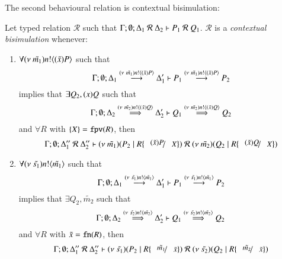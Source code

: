 The second behavioural relation is contextual bisimulation:
%
\begin{definition}\rm
	Let typed relation $\mathcal{R}$ such that $\Gamma; \emptyset; \Delta_1\ \mathcal{R}\ \Delta_2 \proves P_1\ \mathcal{R}\ Q_1$.
	$\mathcal{R}$ is a {\em contextual bisimulation} whenever:
	\begin{enumerate}
		\item	$\forall (\nu\ \tilde{m_1}) n ! \langle (\tilde{x})P \rangle$ such that
			\[
				\Gamma; \emptyset; \Delta_1 \stackrel{(\nu\ \tilde{m_1}) n ! \langle (\tilde{x})P \rangle}{\longrightarrow} \Delta_1' \vdash P_1 \stackrel{(\nu\ \tilde{m_1}) n ! \langle (\tilde{x})P \rangle}{\longrightarrow} P_2
			\]
			implies that $\exists Q_2, (x)Q$ such that
			\[
				\Gamma; \emptyset; \Delta_2 \stackrel{(\nu\ \tilde{m_2}) n ! \langle (\tilde{x})Q \rangle}{\Longrightarrow} \Delta_2' \vdash Q_1 \stackrel{(\nu\ \tilde{m_2}) n ! \langle (\tilde{x})Q \rangle}{\Longrightarrow} Q_2
			\]
			and $\forall R$ with $\{X\} = \mathtt{fpv}(R)$, %
			then
			\[
				\Gamma; \emptyset; \Delta_1''\ \mathcal{R}\ \Delta_2'' \proves \newsp{\tilde{m_1}}{P_2 \Par R\subst{(\tilde{x}) P}{X}}
				\ \mathcal{R}\ 
				\newsp{\tilde{m_2}}{Q_2 \Par R\subst{(\tilde{x}) Q}{X}}
			\]
		\item	$\forall (\nu\ \tilde{s_1}) n ! \langle \tilde{m_1} \rangle$ such that
			\[
				\Gamma; \emptyset; \Delta_1 \stackrel{(\nu\ \tilde{s_1}) n ! \langle \tilde{m_1} \rangle}{\longrightarrow} \Delta_1' \vdash P_1 \stackrel{(\nu\ \tilde{s_1}) n ! \langle \tilde{m_1} \rangle}{\longrightarrow} P_2
			\]
			implies that $\exists Q_2, \tilde{m_2}$ such that
			\[
				\Gamma; \emptyset; \Delta_2 \stackrel{(\nu\ \tilde{s_2}) n ! \langle \tilde{m_2} \rangle}{\Longrightarrow} \Delta_2' \vdash Q_1 \stackrel{(\nu\ \tilde{s_2}) n ! \langle \tilde{m_2} \rangle}{\Longrightarrow} Q_2
			\]
			and $\forall R$ with $\tilde{x} = \mathtt{fn}(R)$, %
			then
			\[
				\Gamma; \emptyset; \Delta_1''\ \mathcal{R}\ \Delta_2'' \proves \newsp{\tilde{s_1}}{P_2 \Par R \subst{\tilde{m_1}}{\tilde{x}}}
				\ \mathcal{R}\ 
				\newsp{\tilde{s_2}}{Q_2 \Par R \subst{\tilde{m_2}}{\tilde{x}}}
			\]


\end{enumerate}
\end{definition}
